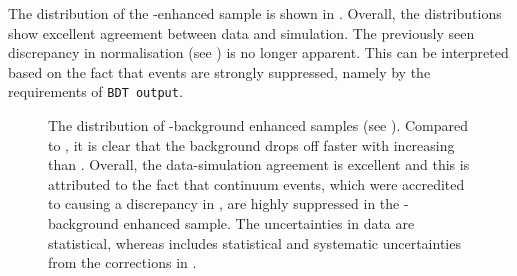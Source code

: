 The \EB distribution of the \BB-enhanced sample is shown in .
Overall, the distributions show excellent agreement between data and simulation.
The previously seen discrepancy in normalisation (see ) is no longer apparent.
This can be interpreted based on the fact that \epem\ra\qqbar events are strongly suppressed, namely 
by the requirements of \texttt{BDT~output}.
\begin{figure}[htbp!]
    \centering
    \caption{\label{fig:bbbar_enhanced_eb} The \EB distribution of \BB-background enhanced samples (see ).
    Compared to , it is clear that the \BB background drops off faster with increasing \EB than \epem\ra\qqbar.
    Overall, the data-simulation agreement is excellent and this is attributed to the fact that continuum events, which were accredited to causing a discrepancy in , are highly suppressed in the \BB-background enhanced sample.
    The uncertainties in data are statistical, whereas \MC includes statistical and systematic uncertainties from the corrections in .
    }
\end{figure}

